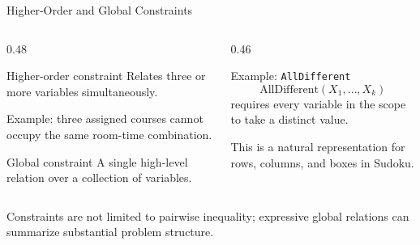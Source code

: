 \documentclass[aspectratio=169,10pt]{beamer}
\begin{document}
\begin{frame}[shrink=20]{Higher-Order and Global Constraints}
  \begin{columns}[T,onlytextwidth]
    \begin{column}{0.48\textwidth}
      \begin{block}{Higher-order constraint}
        Relates three or more variables simultaneously.

        Example: three assigned courses cannot occupy the same room-time combination.
      \end{block}

      \begin{block}{Global constraint}
        A single high-level relation over a collection of variables.
      \end{block}
    \end{column}

    \begin{column}{0.46\textwidth}
      \begin{block}{Example: \texttt{AllDifferent}}
        \[
          \mathrm{AllDifferent}(X_1,\ldots,X_k)
        \]
        requires every variable in the scope to take a distinct value.
      \end{block}

      This is a natural representation for rows, columns, and boxes in Sudoku.
    \end{column}
  \end{columns}

  \begin{keyidea}
    Constraints are not limited to pairwise inequality; expressive global relations can summarize substantial problem structure.
  \end{keyidea}
\end{frame}
\end{document}
